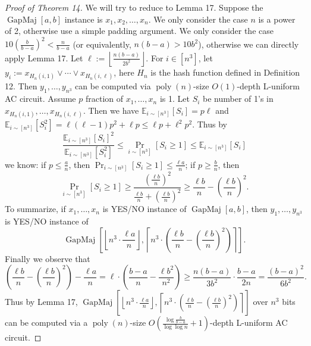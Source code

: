 \documentclass[10pt,a4paper]{article}
\begin{document}
\begin{proof}[Proof of Theorem 14]
We will try to reduce to Lemma 17. Suppose the $\operatorname{GapMaj}[a,b]$ instance is $x_1,x_2,\ldots,x_n$. We only consider the case $n$ is a power of 2, otherwise use a simple padding argument. We only consider the case $10\left(\frac b{b-a}\right)^2<\frac n{b-a}$ (or equivalently, $n(b-a)>10b^2$), otherwise we can directly apply Lemma 17.
Let $\ell:=\left\lfloor\frac{n(b-a)}{2b^2}\right\rfloor$. For $i\in[n^3]$, let $y_i:=x_{H_n(i,1)}\vee\cdots\vee x_{H_n(i,\ell)}$, here $H_n$ is the hash function defined in Definition 12. Then $y_1,\ldots,y_{n^3}$ can be computed via $\operatorname{poly}(n)$-size $O(1)$-depth L-uniform AC circuit.
Assume $p$ fraction of $x_1,\ldots,x_n$ is 1. Let $S_i$ be number of 1's in $x_{H_n(i,1)},\ldots,x_{H_n(i,\ell)}$. Then we have $\mathbb E_{i\sim[n^3]}[S_i]=p\ell$ and $\mathbb E_{i\sim[n^3]}[S_i^2]=\ell(\ell-1)p^2+\ell p\le\ell p+\ell^2 p^2$. Thus by
\[\frac{\mathbb E_{i\sim[n^3]}[S_i]^2}{\mathbb E_{i\sim[n^3]}[S_i^2]}\le\Pr_{i\sim[n^3]}[S_i\ge1]\le\mathbb E_{i\sim[n^3]}[S_i]\]
we know: if $p\le\frac an$, then $\Pr_{i\sim[n^3]}[S_i\ge1]\le\frac{\ell a}n$; if $p\ge\frac bn$, then
\[\Pr_{i\sim[n^3]}[S_i\ge1]\ge\frac{(\frac{\ell b}n)^2}{\frac{\ell b}n+(\frac{\ell b}n)^2}\ge\frac{\ell b}n-\left(\frac{\ell b}n\right)^2.\]
To summarize, if $x_1,\ldots,x_n$ is YES/NO instance of $\operatorname{GapMaj}[a,b]$, then $y_1,\ldots,y_{n^3}$ is YES/NO instance of
\[\operatorname{GapMaj}\left[\left\lfloor n^3\cdot\frac{\ell a}n\right\rfloor,\left\lceil n^3\cdot\left(\frac{\ell b}n-\left(\frac{\ell b}n\right)^2\right)\right\rceil\right].\]
Finally we observe that
\[\left(\frac{\ell b}n-\left(\frac{\ell b}n\right)^2\right)-\frac{\ell a}n=\ell\cdot\left(\frac{b-a}n-\frac{\ell b^2}{n^2}\right)\ge\frac{n(b-a)}{3b^2}\cdot\frac{b-a}{2n}=\frac{(b-a)^2}{6b^2}.\]
Thus by Lemma 17, $\operatorname{GapMaj}\left[\left\lfloor n^3\cdot\frac{\ell a}n\right\rfloor,\left\lceil n^3\cdot\left(\frac{\ell b}n-\left(\frac{\ell b}n\right)^2\right)\right\rceil\right]$ over $n^3$ bits can be computed via a $\operatorname{poly}(n)$-size $O\left(\frac{\log\frac b{b-a}}{\log\log n}+1\right)$-depth L-uniform AC circuit.
\end{proof}
\end{document}
